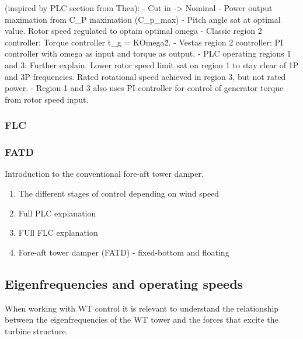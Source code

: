 (inspired by PLC section from Thea):
- Cut in -> Nominal
- Power output maximation from C\_P maximation (C\_p\_max)
- Pitch angle sat at optimal value. Rotor speed regulated to optain optimal omega
- Classic region 2 controller: Torque controller t\_g = KOmega\^2.
- Vestas region 2 controller: PI controller with omega as input and torque as output.
- PLC operating regions 1 and 3: Further explain. Lower rotor speed limit sat on region 1 to stay clear of 1P and 3P frequencies. Rated rotational speed achieved in region 3, but not rated power.
- Region 1 and 3 also uses PI controller for control of generator torque from rotor speed input.





\subsubsection{FLC}



\subsubsection{FATD}
Introduction to the conventional fore-aft tower damper.


\medskip
\medskip
\medskip
\medskip




\begin{enumerate}
	\item The different stages of control depending on wind speed
	\item Full PLC explanation
	\item FUll FLC explanation
	\item Fore-aft tower damper (FATD) - fixed-bottom and floating
\end{enumerate}

\subsection{Eigenfrequencies and operating speeds}
When working with WT control it is relevant to understand the relationship between the eigenfrequencies of the WT tower and the forces that excite the turbine structure.


